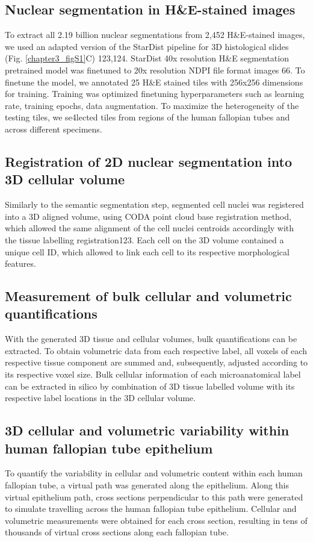 \begin{refsection}
    \subsection{Nuclear segmentation in H\&E-stained images}
    To extract all 2.19 billion nuclear segmentations from 2,452 H\&E-stained images, we used an adapted version of the StarDist pipeline for 3D histological slides (Fig. \ref{chapter3_figS1}C)\cite{Forjaz2025Integration,Schmidt2018Cell} 123,124. StarDist 40x resolution H\&E segmentation pretrained model was finetuned to 20x resolution NDPI file format images\cite{Schmidt2018Cell} 66. To finetune the model, we annotated 25 H\&E stained tiles with 256x256 dimensions for training. Training was optimized finetuning hyperparameters such as learning rate, training epochs, data augmentation. To maximize the heterogeneity of the testing tiles, we se4lected tiles from regions of the human fallopian tubes and across different specimens.
    
    \subsection{Registration of 2D nuclear segmentation into 3D cellular volume}
    Similarly to the semantic segmentation step, segmented cell nuclei was registered into a 3D aligned volume, using CODA point cloud base registration method, which allowed the same alignment of the cell nuclei centroids accordingly with the tissue labelling registration\cite{Forjaz2025Integration}123. Each cell on the 3D volume contained a unique cell ID, which allowed to link each cell to its respective morphological features. 
    
    \subsection{Measurement of bulk cellular and volumetric quantifications}
    With the generated 3D tissue and cellular volumes, bulk quantifications can be extracted. To obtain volumetric data from each respective label, all voxels of each respective tissue component are summed and, subsequently, adjusted according to its respective voxel size. Bulk cellular information of each microanatomical label can be extracted in silico by combination of 3D tissue labelled volume with its respective label locations in the 3D cellular volume.
    
    \subsection{3D cellular and volumetric variability within human fallopian tube epithelium}
    To quantify the variability in cellular and volumetric content within each human fallopian tube, a virtual path was generated along the epithelium. Along this virtual epithelium path, cross sections perpendicular to this path were generated to simulate travelling across the human fallopian tube epithelium. Cellular and volumetric measurements were obtained for each cross section, resulting in tens of thousands of virtual cross sections along each fallopian tube.
    

\end{refsection}
